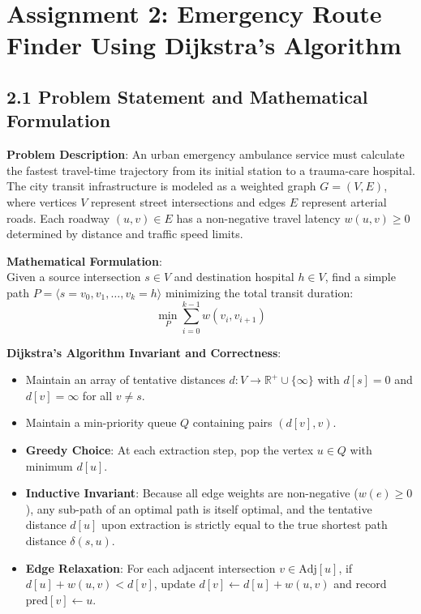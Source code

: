 \documentclass[12pt]{article}
\begin{document}
\section*{Assignment 2: Emergency Route Finder Using Dijkstra’s Algorithm}

\subsection*{2.1 Problem Statement and Mathematical Formulation}
\textbf{Problem Description}: An urban emergency ambulance service must calculate the fastest travel-time trajectory from its initial station to a trauma-care hospital. The city transit infrastructure is modeled as a weighted graph $G = (V, E)$, where vertices $V$ represent street intersections and edges $E$ represent arterial roads. Each roadway $(u, v) \in E$ has a non-negative travel latency $w(u, v) \ge 0$ determined by distance and traffic speed limits.

\textbf{Mathematical Formulation}:\\
Given a source intersection $s \in V$ and destination hospital $h \in V$, find a simple path $P = \langle s = v_0, v_1, \dots, v_k = h \rangle$ minimizing the total transit duration:
\[
\min_{P} \sum_{i=0}^{k-1} w(v_i, v_{i+1})
\]

\textbf{Dijkstra's Algorithm Invariant and Correctness}:
\begin{itemize}
    \item Maintain an array of tentative distances $d: V \to \mathbb{R}^+ \cup \{\infty\}$ with $d[s] = 0$ and $d[v] = \infty$ for all $v \neq s$.
    \item Maintain a min-priority queue $Q$ containing pairs $(d[v], v)$.
    \item \textbf{Greedy Choice}: At each extraction step, pop the vertex $u \in Q$ with minimum $d[u]$.
    \item \textbf{Inductive Invariant}: Because all edge weights are non-negative ($w(e) \ge 0$), any sub-path of an optimal path is itself optimal, and the tentative distance $d[u]$ upon extraction is strictly equal to the true shortest path distance $\delta(s, u)$.
    \item \textbf{Edge Relaxation}: For each adjacent intersection $v \in \text{Adj}[u]$, if $d[u] + w(u, v) < d[v]$, update $d[v] \gets d[u] + w(u, v)$ and record $\text{pred}[v] \gets u$.
\end{itemize}
\end{document}
